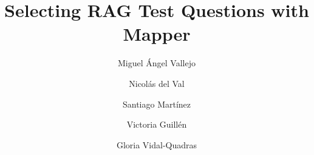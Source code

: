 \documentclass[11pt,a4paper]{article}
\title{Selecting RAG Test Questions with Mapper}
\author{Miguel \'Angel Vallejo \and Nicol\'as del Val \and Santiago Mart\'inez \and Victoria Guill\'en \and Gloria Vidal-Quadras}
\date{}
\theoremstyle{plain}
\theoremstyle{definition}
\theoremstyle{remark}
\begin{document}
\maketitle








\FloatBarrier




\end{document}

